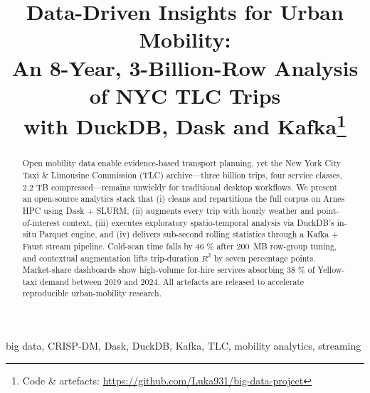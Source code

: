\documentclass[conference]{IEEEtran}
\begin{document}
\title{Data-Driven Insights for Urban Mobility:\\
  An 8-Year, 3-Billion-Row Analysis of NYC TLC Trips\\
  with DuckDB, Dask and Kafka\thanks{Code \& artefacts:
\url{https://github.com/Luka931/big-data-project}}}

\author{
  \and
  }

\maketitle

\begin{abstract}
  Open mobility data enable evidence-based transport planning, yet the
  New York City Taxi \& Limousine Commission (TLC) archive—three billion
  trips, four service classes, 2.2 TB compressed—remains unwieldy for
  traditional desktop workflows.
  We present an open-source analytics stack that (i) cleans and
  repartitions the full corpus on Arnes HPC using Dask + SLURM,
  (ii) augments every trip with hourly weather and point-of-interest
  context, (iii) executes exploratory spatio-temporal analysis via
  DuckDB’s in-situ Parquet engine, and (iv) delivers sub-second rolling
  statistics through a Kafka + Faust stream pipeline.
  Cold-scan time falls by 46 \% after \SI{200}{MB} row-group tuning, and
  contextual augmentation lifts trip-duration \(R^{2}\) by seven
  percentage points.
  Market-share dashboards show high-volume for-hire services absorbing
  38 \% of Yellow-taxi demand between 2019 and 2024.
  All artefacts are released to accelerate reproducible
  urban-mobility research.
\end{abstract}

\begin{IEEEkeywords}
  big data, CRISP-DM, Dask, DuckDB, Kafka, TLC, mobility analytics,
  streaming
\end{IEEEkeywords}

\end{document}
